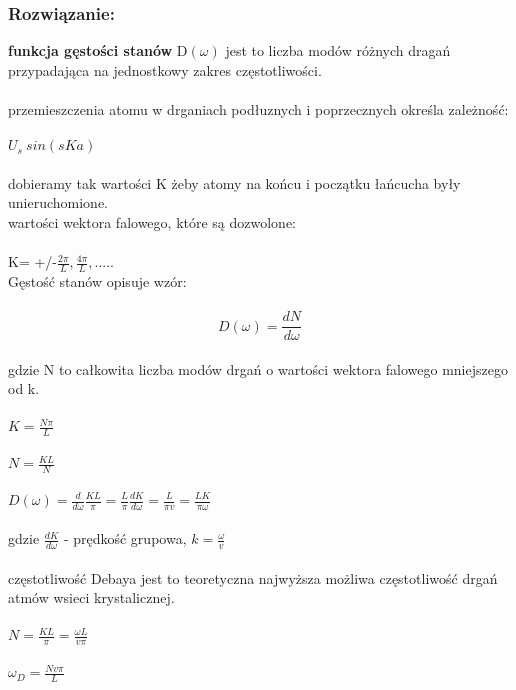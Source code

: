 \subsubsection*{Rozwiązanie:}
\textbf{funkcja gęstości stanów}
D$(\omega)$ jest to liczba modów różnych dragań przypadająca na jednostkowy zakres częstotliwości.
\\
\\
przemieszczenia atomu w drganiach podłuznych i poprzecznych określa zależność:
\\
\\
$U_s ~sin(sKa)$
\\
\\
dobieramy tak wartości K żeby atomy na końcu i początku łańcucha były unieruchomione.
\\
wartości wektora falowego, które są dozwolone:
\\
\\
K= +/-$\frac{2\pi}{L},\frac{4\pi}{L},.....$
\\
Gęstość stanów opisuje wzór:
\\
\\
\begin{equation}
D(\omega)=\frac{dN}{d\omega}
\end{equation}
\\
gdzie N to całkowita liczba modów drgań o wartości wektora falowego mniejszego od k.
\\
\\
$K=\frac{N\pi}{L}$
\\
\\
$N=\frac{KL}{N}$
\\
\\
$D(\omega)=\frac{d}{d\omega}\frac{KL}{\pi}=\frac{L}{\pi}\frac{dK}{d\omega}=\frac{L}{\pi v}=\frac{L K}{\pi \omega}$
\\
\\
gdzie $\frac{dK}{d\omega}$ - prędkość grupowa, $k=\frac{\omega}{v}$
\\
\\
częstotliwość Debaya jest to teoretyczna najwyższa możliwa częstotliwość drgań atmów  wsieci krystalicznej.
\\
\\
$N=\frac{KL}{\pi}=\frac{\omega L}{v\pi}$
\\
\\
$\omega_D=\frac{Nv\pi}{L}$


\hrulefill

